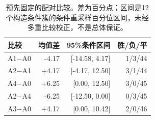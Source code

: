 \begin{table}[t]
\caption{预先固定的配对比较。差为百分点；区间是12个构造条件簇的条件重采样百分位区间，未经多重比较校正，不是总体保证。}\label{tab:effects}
\centering\small
\begin{tabularx}{\textwidth}{Xrrr}
\toprule
比较 & 均值差 & 95\%条件区间 & 胜/负/平 \\
\midrule
A1$-$A0 & -4.17 & [-14.58, 4.17] & 1/3/44 \\
A2$-$A1 & +4.17 & [-4.17, 12.50] & 3/1/44 \\
A4$-$A0 & +6.25 & [0.00, 12.50] & 3/0/45 \\
A2$-$A4 & -6.25 & [-12.50, 0.00] & 0/3/45 \\
A3$-$A0 & +4.17 & [0.00, 10.42] & 2/0/46 \\
\bottomrule
\end{tabularx}
\end{table}
